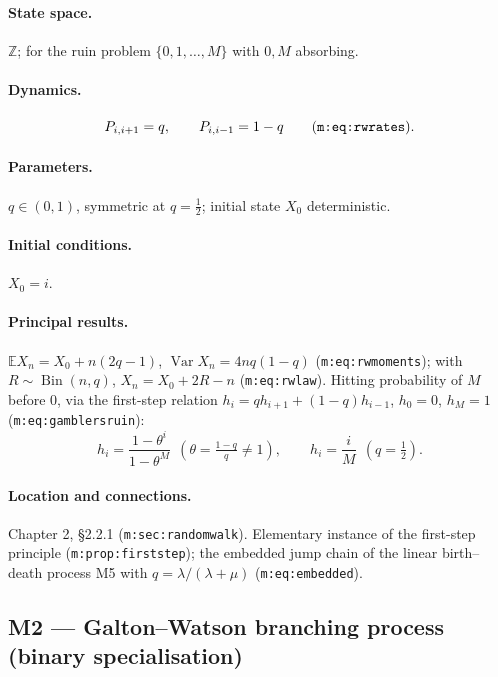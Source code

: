 \documentclass[11pt,a4paper]{article}
\newcommand{\EX}{\mathbb{E}}
\newcommand{\Var}{\operatorname{Var}}
\begin{document}
\paragraph{State space.} $\mathbb Z$; for the ruin problem
$\{0,1,\ldots,M\}$ with $0,M$ absorbing.

\paragraph{Dynamics.}
\[
P_{i,i+1}=q,\qquad P_{i,i-1}=1-q
\qquad\text{(\texttt{m:eq:rwrates})}.
\]

\paragraph{Parameters.} $q\in(0,1)$, symmetric at $q=\tfrac12$; initial
state $X_0$ deterministic.

\paragraph{Initial conditions.} $X_0=i$.

\paragraph{Principal results.} $\EX{X_n}=X_0+n(2q-1)$, $\Var{X_n}=4nq(1-q)$
(\texttt{m:eq:rwmoments}); with $R\sim\operatorname{Bin}(n,q)$,
$X_n=X_0+2R-n$ (\texttt{m:eq:rwlaw}). Hitting probability of $M$ before $0$,
via the first-step relation $h_i=qh_{i+1}+(1-q)h_{i-1}$, $h_0=0$, $h_M=1$
(\texttt{m:eq:gamblersruin}):
\[
h_i=\frac{1-\theta^i}{1-\theta^M}\ \ (\theta=\tfrac{1-q}{q}\ne1),
\qquad h_i=\frac{i}{M}\ \ (q=\tfrac12).
\]

\paragraph{Location and connections.} Chapter 2, \S2.2.1
(\texttt{m:sec:randomwalk}). Elementary instance of the first-step
principle (\texttt{m:prop:firststep}); the embedded jump chain of the linear
birth--death process M5 with $q=\lambda/(\lambda+\mu)$
(\texttt{m:eq:embedded}).

\subsection{M2 --- Galton--Watson branching process (binary specialisation)}
\label{sec:M2}
\end{document}
